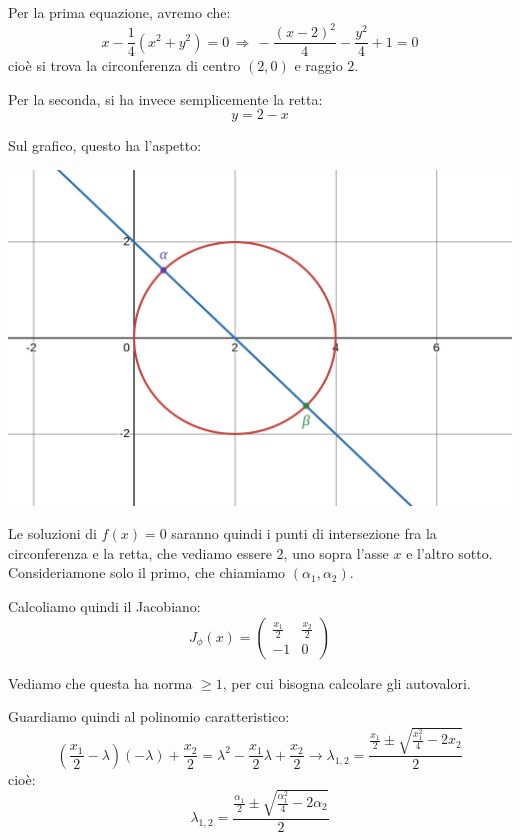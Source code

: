 \documentclass[a4paper,11pt]{article}
\begin{document}
Per la prima equazione, avremo che:
$$
x - \frac{1}{4} (x^2 + y^2) = 0 \, \Rightarrow \, - \frac{(x - 2)^2}{4} - \frac{y^2}{4} + 1 = 0
$$
cioè si trova la circonferenza di centro $(2, 0)$ e raggio $2$.

Per la seconda, si ha invece semplicemente la retta:
$$
y = 2 - x
$$

Sul grafico, questo ha l'aspetto:
\begin{center}
	\includegraphics[scale=0.3]{../figures/nonlin.png}
\end{center}

Le soluzioni di $f(x) = 0$ saranno quindi i punti di intersezione fra la circonferenza e la retta, che vediamo essere 2, uno sopra l'asse $x$ e l'altro sotto.
Consideriamone solo il primo, che chiamiamo $(\alpha_1, \alpha_2)$.

\par\smallskip

Calcoliamo quindi il Jacobiano:
$$
J_\phi(x) =
\begin{pmatrix}
	\frac{x_1}{2} & \frac{x_2}{2} \\
	-1 & 0
\end{pmatrix}
$$

Vediamo che questa ha norma $\geq 1$, per cui bisogna calcolare gli autovalori.

Guardiamo quindi al polinomio caratteristico:
$$
\left(\frac{x_1}{2} - \lambda\right) \left(-\lambda\right) + \frac{x_2}{2} = \lambda^2 - \frac{x_1}{2} \lambda + \frac{x_2}{2} \rightarrow \lambda_{1, 2} = \frac{\frac{x_1}{2} \pm \sqrt{\frac{x_1^2}{4} - 2 x_2}}{2}
$$
cioè:
$$
\lambda_{1, 2} = \frac{\frac{\alpha_1}{2} \pm \sqrt{\frac{\alpha_1^2}{4} - 2 \alpha_2}}{2}
$$
\end{document}
